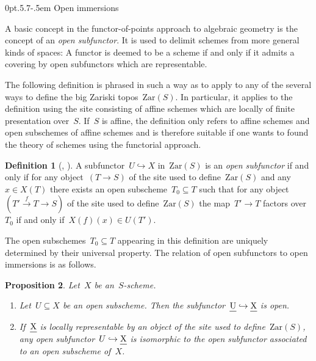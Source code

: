 \documentclass[10pt,reqno,a4paper]{amsbook}
\makeatletter
\theoremstyle{definition}
\newtheorem{defn}{Definition}[section]
\theoremstyle{plain}
\newtheorem{prop}[defn]{Proposition}
\theoremstyle{remark}
\let\oldul\ul
\renewcommand{\ul}[1]{\text{\oldul{$#1$}}}
\newcommand{\Zar}{\mathrm{Zar}}
\newcommand{\?}{\,{:}\,}
\renewcommand{\_}{\mathpunct{.}\,}
\newcommand{\xra}{\xrightarrow}
\def\subsection{\@startsection{subsection}{2}%
  {0pt}{.5\linespacing\@plus.7\linespacing}{-.5em}%
  {\normalfont\bfseries}}
\makeatother
\begin{document}
\subsection{Open immersions}

A basic concept in the functor-of-points approach to algebraic geometry is the
concept of an \emph{open subfunctor}. It is used to delimit schemes from more
general kinds of spaces: A functor is deemed to be a scheme if and only if it
admits a covering by open subfunctors which are representable.

The following definition is phrased in such a way as to apply to any of the
several ways to define the big Zariski topos~$\Zar(S)$. In particular, it
applies to the definition using the site consisting of affine schemes which are
locally of finite presentation over~$S$. If~$S$ is affine, the definition only
refers to affine schemes and open subschemes of affine schemes and is therefore
suitable if one wants to found the theory of schemes using the functorial
approach.

\begin{defn}[{\cite[Définition~I.1.3.6 on page~10]{demazure:gabriel},
\cite[Tag~01JI]{stacks-project}}]
A subfunctor~$U \hookrightarrow X$ in~$\Zar(S)$ is an \emph{open subfunctor} if
and only if for any object~$(T \to S)$ of the site used to define~$\Zar(S)$
and any~$x \in X(T)$ there exists an open subscheme~$T_0 \subseteq T$
such that for any object~$(T' \xra{f} T \to S)$ of the site used to
define~$\Zar(S)$ the map~$T' \to T$ factors over~$T_0$ if and only if~$X(f)(x)
\in U(T')$.
\end{defn}

The open subschemes~$T_0 \subseteq T$ appearing in this definition are uniquely
determined by their universal property. The relation of open subfunctors to
open immersions is as follows.

\begin{prop}\label{prop:char-open-immersion}
Let~$X$ be an~$S$-scheme.
\begin{enumerate}
\item Let~$U \subseteq X$ be an open subscheme. Then the subfunctor~$\ul{U}
\hookrightarrow \ul{X}$ is open.
\item If~$\ul{X}$ is locally representable by an object of the site used to
define~$\Zar(S)$, any open subfunctor~$U \hookrightarrow \ul{X}$ is isomorphic
to the open subfunctor associated to an open subscheme of~$X$.
\end{enumerate}
\end{prop}
\end{document}
